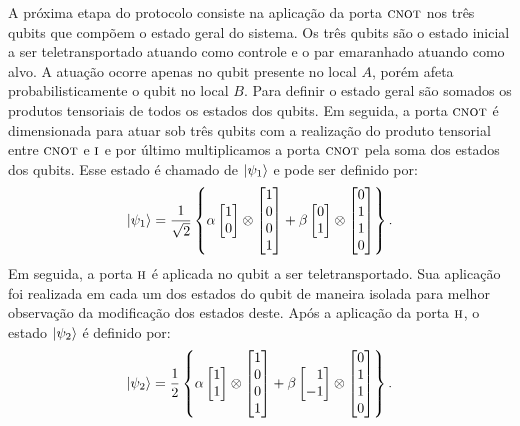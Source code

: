 A próxima etapa do protocolo consiste na aplicação da porta \(\operatorname{\textsc{cnot}}\) nos três qubits que compõem o estado geral do sistema. Os três qubits são o estado inicial a ser teletransportado atuando como controle e o par emaranhado atuando como alvo. A atuação ocorre apenas no qubit presente no local \(A\), porém afeta probabilisticamente o qubit no local \(B\). Para definir o estado geral são somados os produtos tensoriais de todos os estados dos qubits. Em seguida, a porta \(\operatorname{\textsc{cnot}}\) é dimensionada para atuar sob três qubits com a realização do produto tensorial entre \(\operatorname{\textsc{cnot}}\) e \(\operatorname{\textsc{i}}\) e por último multiplicamos a porta \(\operatorname{\textsc{cnot}}\) pela soma dos estados dos qubits. Esse estado é chamado de \(\ket{\psi_1}\) e pode ser definido por:
\[
  \ket{\psi_1} = \frac{1}{\sqrt2} \left\{
    \alpha
    \begin{bmatrix} 1 \\ 0 \end{bmatrix} \otimes
    \begin{bmatrix} 1 \\ 0 \\ 0 \\ 1 \end{bmatrix} +
    \beta
    \begin{bmatrix} 0 \\ 1 \end{bmatrix} \otimes
    \begin{bmatrix} 0 \\ 1 \\ 1 \\ 0 \end{bmatrix}
  \right\}.
\]
Em seguida, a porta \(\operatorname{\textsc{h}}\) é aplicada no qubit a ser teletransportado. Sua aplicação foi realizada em cada um dos estados do qubit de maneira isolada para melhor observação da modificação dos estados deste. Após a aplicação da porta \(\operatorname{\textsc{h}}\), o estado \(\ket{\psi_2}\) é definido por:
\[
  \ket{\psi_2} = \frac{1}{2} \left\{
    \alpha
    \begin{bmatrix} 1 \\ 1 \end{bmatrix} \otimes
    \begin{bmatrix} 1 \\ 0 \\ 0 \\ 1 \end{bmatrix} +
    \beta
    \begin{bmatrix*}[r] 1 \\ -1 \end{bmatrix*} \otimes
    \begin{bmatrix} 0 \\ 1 \\ 1 \\ 0 \end{bmatrix}
  \right\}.
\]


